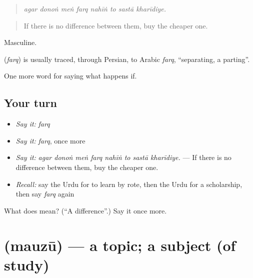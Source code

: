 \begin{quote}
       
\end{quote}

\begin{quote}
\emph{agar donoṅ meṅ farq nahīṅ to sastā kharīdiye.}
\end{quote}

\begin{quote}
If there is no difference between them, buy the cheaper one.
\end{quote}

Masculine.

\begin{cousinweb}
\textbf{} (\emph{farq}) is usually traced, through Persian, to Arabic \emph{farq}, \textquotedblleft{}separating, a parting\textquotedblright{}.
\end{cousinweb}

\begin{grammarlens}[title={What you've built}]
One more word for saying what happens if.
\end{grammarlens}

\subsection*{Your turn}
\begin{itemize}
\raggedright
  \item \emph{Say it:} \emph{farq}
  \item \emph{Say it:} \emph{farq}, once more
  \item \emph{Say it:} \emph{agar donoṅ meṅ farq nahīṅ to sastā kharīdiye.} — If there is no difference between them, buy the cheaper one.
  \item \emph{Recall:} say the Urdu for to learn by rote, then the Urdu for a scholarship, then say \emph{farq} again
\end{itemize}

\begin{tcolorbox}[breakable,colback=teal!4,colframe=teal!35!black,title={Before you move on}]
What does  mean? (\textquotedblleft{}A difference\textquotedblright{}.) Say it once more.
\end{tcolorbox}
\section[\texorpdfstring{\ur{موضوع} (mauzū)}{موضوع (mauzū)}]{ (mauzū) — a topic; a subject (of study)}

